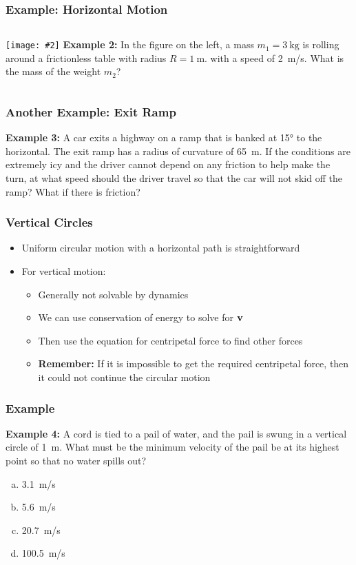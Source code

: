 \documentclass[12pt,compress,aspectratio=169]{beamer}
\newcommand{\pic}[2]{\texttt{[image: \#2]}}
\newcommand{\mb}[1]{\ensuremath\mathbf{#1}}
\begin{document}
\begin{frame}
  \frametitle{Example: Horizontal Motion}
  \begin{columns}
    \pic{1}{puck-on-table.jpg}
    \textbf{Example 2:} In the figure on the left, a mass $m_1=\SI{3}{\kg}$ is
    rolling around a frictionless table with radius $R=\SI{1}{\metre}$. with a
    speed of \SI{2}{\metre/s}. What is the mass of the weight $m_2$?
  \end{columns}
\end{frame}


\begin{frame}
  \frametitle{Another Example: Exit Ramp}
  \textbf{Example 3:} A car exits a highway on a ramp that is banked at
  \ang{15} to the horizontal. The exit ramp has a radius of curvature of
  \SI{65}{\metre}. If the conditions are extremely icy and the driver cannot
  depend on any friction to help make the turn, at what speed should the driver
  travel so that the car will not skid off the ramp? What if there is friction?
\end{frame}


\begin{frame}
  \frametitle{Vertical Circles}
  \begin{itemize}
  \item Uniform circular motion with a horizontal path is straightforward
  \item For vertical motion:
    \begin{itemize}
    \item Generally not solvable by dynamics
    \item We can use conservation of energy to solve for $\mb{v}$
    \item Then use the equation for centripetal force to find other forces
    \item\textbf{Remember: } If it is impossible to get the required
      centripetal force, then it could not continue the circular motion
    \end{itemize}
  \end{itemize}
\end{frame}


\begin{frame}
  \frametitle{Example}
  \textbf{Example 4:} A cord is tied to a pail of water, and the pail is swung
  in a vertical circle of \SI{1}{\metre}. What must be the minimum velocity of
  the pail be at its highest point so that no water spills out?

  \begin{enumerate}[(a)]
  \item\SI{3.1}{m/\s}
  \item\SI{5.6}{m/\s}
  \item\SI{20.7}{m/\s}
  \item\SI{100.5}{m/\s}
  \end{enumerate}
\end{frame}
\end{document}
